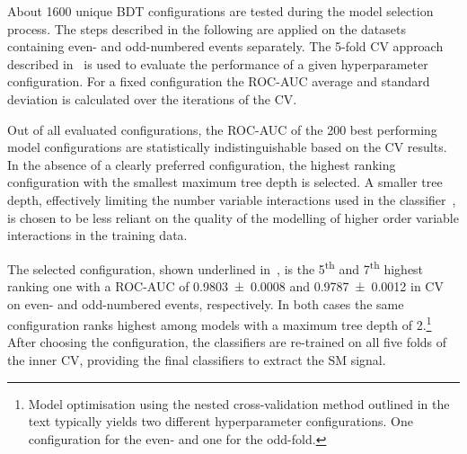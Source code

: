 About 1600 unique BDT configurations are tested during the model
selection process. The steps described in the following are applied on
the datasets containing even- and odd-numbered events separately. The
5-fold CV approach described in~ is used
to evaluate the performance of a given hyperparameter
configuration. For a fixed configuration the ROC-AUC average and
standard deviation is calculated over the iterations of the CV.

Out of all evaluated configurations, the ROC-AUC of the 200 best
performing model configurations are statistically indistinguishable
based on the CV results. In the absence of a clearly preferred
configuration, the highest ranking configuration with the smallest
maximum tree depth is selected. A smaller tree depth, effectively
limiting the number variable interactions used in the
classifier~\cite{hastie09}, is chosen to be less reliant on the
quality of the modelling of higher order variable interactions in the
training data.

The selected configuration, shown underlined
in~, is the 5\textsuperscript{th}
and 7\textsuperscript{th} highest ranking one with a ROC-AUC of
\num{0.9803 +- 0.0008} and \num{0.9787 +- 0.0012} in CV on even- and
odd-numbered events, respectively. In both cases the same
configuration ranks highest among models with a maximum tree depth of
2.\footnote{Model optimisation using the nested cross-validation
  method outlined in the text typically yields two different
  hyperparameter configurations. One configuration for the even- and
  one for the odd-fold.} After choosing the configuration, the
classifiers are re-trained on all five folds of the inner CV,
providing the final classifiers to extract the SM \HH signal.




